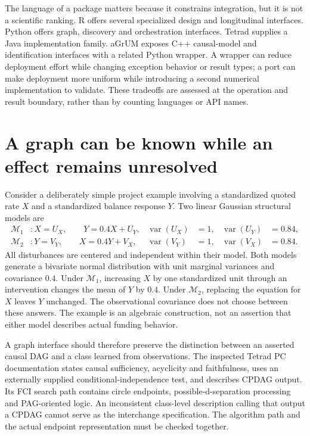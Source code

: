 The language of a package matters because it constrains integration, but it is
not a scientific ranking. R offers several specialized design and longitudinal
interfaces. Python offers graph, discovery and orchestration interfaces.
Tetrad supplies a Java implementation family. aGrUM exposes C++ causal-model
and identification interfaces with a related Python wrapper. A wrapper can
reduce deployment effort while changing exception behavior or result types;
a port can make deployment more uniform while introducing a second numerical
implementation to validate. These tradeoffs are assessed at the operation and
result boundary, rather than by counting languages or API names.

\section{A graph can be known while an effect remains unresolved}

Consider a deliberately simple project example involving a standardized quoted
rate \(X\) and a standardized balance response \(Y\). Two linear Gaussian
structural models are
\begin{align}
 \mathcal M_1 &: X=U_X,\qquad Y=0.4X+U_Y,
    &\operatorname{var}(U_X)&=1,&\operatorname{var}(U_Y)&=0.84,\\
 \mathcal M_2 &: Y=V_Y,\qquad X=0.4Y+V_X,
    &\operatorname{var}(V_Y)&=1,&\operatorname{var}(V_X)&=0.84.
\end{align}
All disturbances are centered and independent within their model. Both models
generate a bivariate normal distribution with unit marginal variances and
covariance \(0.4\). Under \(\mathcal M_1\), increasing \(X\) by one standardized
unit through an intervention changes the mean of \(Y\) by \(0.4\). Under
\(\mathcal M_2\), replacing the equation for \(X\) leaves \(Y\) unchanged. The
observational covariance does not choose between these answers. The example
is an algebraic construction, not an assertion that either model describes
actual funding behavior.

A graph interface should therefore preserve the distinction between an
asserted causal DAG and a class learned from observations. The inspected
Tetrad PC documentation states causal sufficiency, acyclicity and faithfulness,
uses an externally supplied conditional-independence test, and describes CPDAG
output. Its FCI search path contains circle endpoints, possible-d-separation
processing and PAG-oriented logic. An inconsistent class-level description
calling that output a CPDAG cannot serve as the interchange specification.
The algorithm path and the actual endpoint representation must be checked
together.\cite{tetrad}

